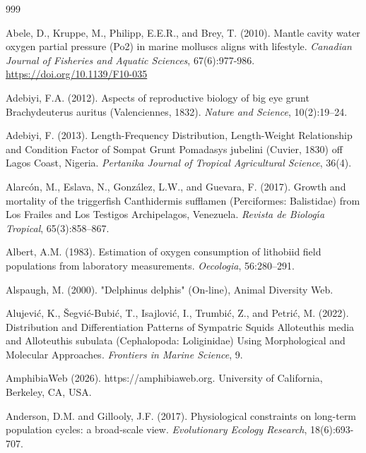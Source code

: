 \begin{thebibliography}{999}

Abele, D., Kruppe, M., Philipp, E.E.R., and Brey, T. (2010). Mantle cavity water oxygen partial pressure (Po2) in marine molluscs aligns with lifestyle. \textit{Canadian Journal of Fisheries and Aquatic Sciences}, 67(6):977-986. \url{https://doi.org/10.1139/F10-035}

Adebiyi, F.A. (2012). Aspects of reproductive biology of big eye grunt Brachydeuterus auritus (Valenciennes, 1832). \textit{Nature and Science}, 10(2):19--24.

Adebiyi, F. (2013). Length-Frequency Distribution, Length-Weight Relationship and Condition Factor of Sompat Grunt Pomadasys jubelini (Cuvier, 1830) off Lagos Coast, Nigeria. \textit{Pertanika Journal of Tropical Agricultural Science}, 36(4).

Alarc{\'o}n, M., Eslava, N., Gonz{\'a}lez, L.W., and Guevara, F. (2017). Growth and mortality of the triggerfish Canthidermis sufflamen (Perciformes: Balistidae) from Los Frailes and Los Testigos Archipelagos, Venezuela. \textit{Revista de Biolog{\'\i}a Tropical}, 65(3):858--867.

Albert, A.M. (1983). Estimation of oxygen consumption of lithobiid field populations from laboratory measurements. \textit{Oecologia}, 56:280--291.

Alspaugh, M. (2000). "Delphinus delphis" (On-line), {Animal Diversity Web}.

Alujevi{\'c}, K., {\v S}egvi{\'c}-Bubi{\'c}, T., Isajlovi{\'c}, I., Trumbi{\'c}, Z., and Petri{\'c}, M. (2022). Distribution and Differentiation Patterns of Sympatric Squids Alloteuthis media and Alloteuthis subulata (Cephalopoda: Loliginidae) Using Morphological and Molecular Approaches. \textit{Frontiers in Marine Science}, 9.

AmphibiaWeb (2026). https://amphibiaweb.org. University of California, Berkeley, CA, USA.

Anderson, D.M. and Gillooly, J.F. (2017). Physiological constraints on long-term population cycles: a broad-scale view. \textit{Evolutionary Ecology Research}, 18(6):693-707.


\end{thebibliography}
